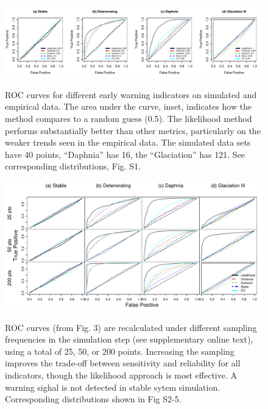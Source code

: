 \documentclass{pnastwo}
\begin{document}
 \begin{figure}
   \begin{center}
     \includegraphics[width=\linewidth]{Fig3.pdf}
     \label{fig3}
     \caption{ROC curves for different early warning indicators on simulated and empirical data.  The area under the curve, inset, indicates how the method compares to a random guess (0.5).  The likelihood method performs substantially better than other metrics, particularly on the weaker trends seen in the empirical data. The simulated data sets have 40 points, ``Daphnia'' has 16, the ``Glaciation'' has 121. See corresponding distributions, Fig. S1.}
  \end{center}
 \end{figure}


 \begin{figure}
   \begin{center}
     \includegraphics[width=\linewidth]{Fig4.pdf}
     \label{fig4}
     \caption{ROC curves (from Fig. 3) are recalculated under different sampling frequencies in the simulation step (see supplementary online text), using a total of 25, 50, or 200 points.  Increasing the sampling improves the trade-off between sensitivity and reliability for all indicators, though the likelihood approach is most effective. A warning sighal is not detected in stable sytem simulation. Corresponding distributions shown in Fig S2-5.} 
  \end{center}
 \end{figure}
\end{document}

